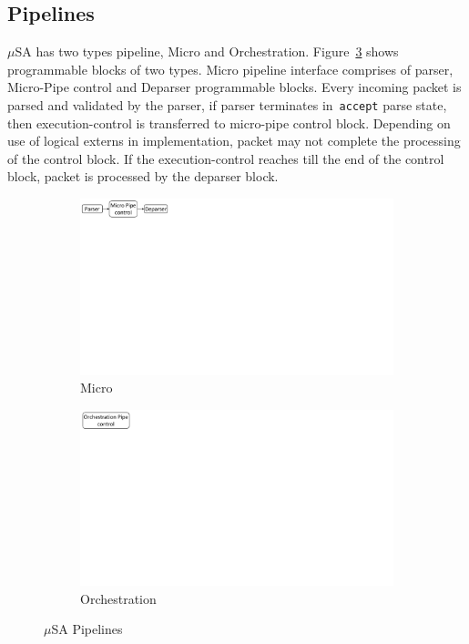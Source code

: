 \subsection{Pipelines}
\label{subsection:pipelines}
$\mu$SA has two types pipeline, Micro and Orchestration.
Figure~\ref{fig:msa-pipelines} shows programmable blocks of two types.
Micro pipeline interface comprises of parser, Micro-Pipe control and Deparser programmable blocks.
Every incoming packet is parsed and validated by the parser, if parser terminates in~\texttt{accept} parse state, then execution-control is transferred to micro-pipe control block.
Depending on use of logical externs in implementation, packet may not complete the processing of the control block.
If the execution-control reaches till the end of the control block, packet is processed by the deparser block.
\begin{figure}[!ht]
    \begin{subfigure}{0.45\linewidth}
        \centering
        \includegraphics[trim=0 482 692 0, clip,scale=0.45]{msa-pipeline}
        \caption{Micro}
        \label{subfig:micro}
    \end{subfigure}
    \begin{subfigure}{0.45\linewidth}
        \centering
        \includegraphics[trim=0 480 805 0,clip,scale=0.45]{micro-orchestration-pipeline}
        \caption{Orchestration}
        \label{subfig:orchestration}
    \end{subfigure}
\caption{$\mu$SA Pipelines}
\label{fig:msa-pipelines}
\end{figure}

